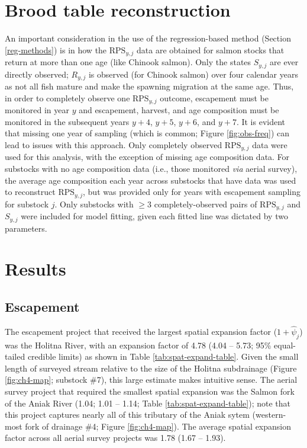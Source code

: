 \documentclass[12pt,]{book}
\theoremstyle{definition}
\theoremstyle{definition}
\theoremstyle{definition}
\theoremstyle{remark}
\begin{document}
\section{Brood table reconstruction}\label{lm-btable}

\noindent
An important consideration in the use of the regression-based method
(Section \ref{reg-methods}) is in how the \(\text{RPS}_{y,j}\) data are
obtained for salmon stocks that return at more than one age (like
Chinook salmon). Only the states \(S_{y,j}\) are ever directly observed;
\(R_{y,j}\) is observed (for Chinook salmon) over four calendar years as
not all fish mature and make the spawning migration at the same age.
Thus, in order to completely observe one \(\text{RPS}_{y,j}\) outcome,
escapement must be monitored in year \(y\) and escapement, harvest, and
age composition must be monitored in the subsequent years \(y+4\),
\(y+5\), \(y+6\), and \(y+7\). It is evident that missing one year of
sampling (which is common; Figure \ref{fig:obs-freq}) can lead to issues
with this approach. Only completely observed \(\text{RPS}_{y,j}\) data
were used for this analysis, with the exception of missing age
composition data. For substocks with no age composition data (i.e.,
those monitored \emph{via} aerial survey), the average age composition
each year across substocks that have data was used to reconstruct
\(\text{RPS}_{y,j}\), but was provided only for years with escapement
sampling for substock \(j\). Only substocks with \(\ge3\)
completely-observed pairs of \(\text{RPS}_{y,j}\) and \(S_{y,j}\) were
included for model fitting, given each fitted line was dictated by two
parameters.

\section{Results}\label{results-3}

\subsection{Escapement}\label{esc-data-results}

\noindent
The escapement project that received the largest spatial expansion
factor (\(1 + \hat{\psi}_j\)) was the Holitna River, with an expansion
factor of 4.78 (4.04 -- 5.73; 95\% equal-tailed credible limits) as
shown in Table \ref{tab:spat-expand-table}. Given the small length of
surveyed stream relative to the size of the Holitna subdrainage (Figure
\ref{fig:ch4-map}; substock \#7), this large estimate makes intuitive
sense. The aerial survey project that required the smallest spatial
expansion was the Salmon fork of the Aniak River (1.04; 1.01 -- 1.14;
Table \ref{tab:spat-expand-table}); note that this project captures
nearly all of this tributary of the Aniak sytem (western-most fork of
drainage \#4; Figure \ref{fig:ch4-map}). The average spatial expansion
factor across all aerial survey projects was 1.78 (1.67 -- 1.93).
\end{document}
